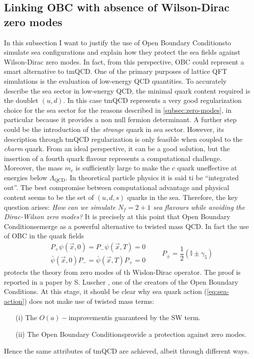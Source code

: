 \documentclass[english, LaM, oneside, noexaminfo]{sapthesis}
\newcommand{\oait}{$O(a)-$improvement}
\newcommand{\obc}{Open Boundary Conditions}
\begin{document}
\subsection{Linking OBC with absence of Wilson-Dirac zero modes}
\noindent
In this subsection I want to justify the use of \obc\space to simulate sea configurations and explain how they protect the sea fields against Wilson-Dirac zero modes.
In fact, from this perspective, OBC could represent a smart alternative to tmQCD.
\newline 
One of the primary purposes of lattice QFT simulations is the evaluation of low-energy QCD quantities.
To accurately describe the sea sector in low-energy QCD, the minimal quark content required is the doublet $(u, d)$.
In this case tmQCD represents a very good regularization choice for the sea sector for the reasons described in \ref{subsec:zero-modes}, in particular because it provides a non null fermion determinant.
\newline
A further step could be the introduction of the {\it strange} quark in sea sector.
However, its description through tmQCD regularization is only feasible when coupled to the {\it charm} quark.
From an ideal perspective, it can be a good solution, but the insertion of a fourth quark flavour represents a computational challenge.
Moreover, the mass $m_c$ is sufficiently large to make the $c$ quark uneffective at energies below $\Lambda_{\text{QCD}}$.
In theoretical particle physics it is said ti be ``integrated out''.
The best compromise between computational advantage and physical content seems to be the set of $(u,d,s)$ quarks in the sea.
\newline
Therefore, the key question arises: \textit{How can we simulate $N_f = 2+1$ sea flavours while avoiding the Dirac-Wilson zero modes?}
It is precisely at this point that \obc\space emerge as a powerful alternative to twisted mass QCD. 
In fact the use of OBC in the quark fields
\begin{equation}\label{eq:obc-on-fermions}
    \begin{aligned}
        & P_+ \psi (\vec x, 0) = P_- \psi (\vec x, T) = 0 \\
        & \bar\psi (\vec x, 0) P_- = \bar\psi (\vec x, T) P_+ = 0 
    \end{aligned}
    \quad\quad P_{\pm} = \frac{1}{2}\left(\mathbb{I} \pm \gamma_5 \right)
\end{equation}
protects the theory from zero modes of th Wislon-Dirac operator.
The proof is reported in a paper by S. Luscher \cite{SF-luscher}, one of the creators of the \obc.
\newline
At this stage, it should be clear why sea quark action (\ref{eq:sea-action}) does not make use of twisted mass terms:
\begin{itemize}
    \item [(i)] The \oait\space is guaranteed by the SW term.
    \item [(ii)] The \obc\space provide a protection against zero modes.
\end{itemize}
Hence the same attributes of tmQCD are achieved, albeit through different ways.
\end{document}
